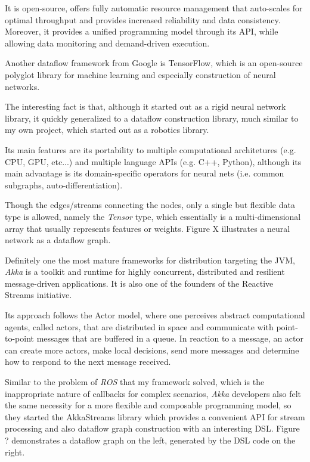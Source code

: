 \documentclass{dithesis}
\begin{document}
It is open-source, offers fully automatic resource management that auto-scales for optimal throughput and provides increased reliability and data consistency. Moreover, it provides a unified programming model through its API, while allowing data monitoring and demand-driven execution.


Another dataflow framework from Google is TensorFlow, which is an open-source polyglot library for machine learning and especially construction of neural networks.

The interesting fact is that, although it started out as a rigid neural network library, it quickly generalized to a dataflow construction library, much similar to my own project, which started out as a robotics library. 

Its main features are its portability to multiple computational architetures (e.g. CPU, GPU, etc...) and multiple language APIs (e.g. C++, Python), although its main advantage is its domain-specific operators for neural nets (i.e. common subgraphs, auto-differentiation).

Though the edges/streams connecting the nodes, only a single but flexible data type is allowed, namely the \textit{Tensor} type, which essentially is a multi-dimensional array that usually represents features or weights. Figure X illustrates a neural network as a dataflow graph.



Definitely one the most mature frameworks for distribution targeting the JVM, \textit{Akka} is a toolkit and runtime for highly concurrent, distributed and resilient message-driven applications. It is also one of the founders of the Reactive Streams\cite{rss} initiative.

Its approach follows the Actor model\cite{actor}, where one perceives abstract computational agents, called actors, that are distributed in space and communicate with point-to-point messages that are buffered in a queue. In reaction to a message, an actor can create more actors, make local decisions, send more messages and determine how to respond to the next message received.

Similar to the problem of \textit{ROS} that my framework solved, which is the inappropriate nature of callbacks for complex scenarios, \textit{Akka} developers also felt the same necessity for a more flexible and composable programming model, so they started the AkkaStreams library which provides a convenient API for stream processing and also dataflow graph construction with an interesting DSL. Figure ? demonstrates a dataflow graph on the left, generated by the DSL code on the right.
\end{document}
